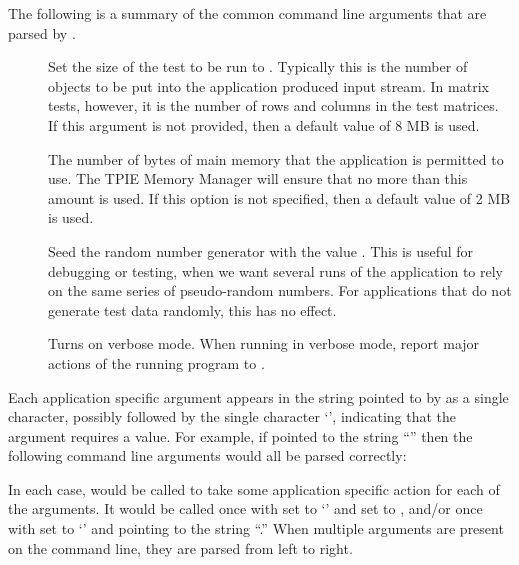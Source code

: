 The following is a summary of the common command line arguments that
are parsed by .
\begin{description}
    \item[] Set the size of the test to
    be run to .  Typically this is the
    number of objects to be put into the application
    produced input stream.  In matrix tests, however, it is
    the number of rows and columns in the test matrices.  If
    this argument is not provided, then a default value of
    8 MB is used.
    \item[] The number of bytes of main
    memory that the application is permitted to use.  The
    TPIE Memory Manager will ensure
    that no more than this amount is used.  If this option
    is not specified, then a default value of 2 MB is used.
    \item[] Seed the random number
    generator with the value .  This is
    useful for debugging or testing, when we want several
    runs of the application to rely on the same series of
    pseudo-random numbers.  For applications that do not
    generate test data randomly, this has no effect.
\item[]
Turns on verbose mode.  When running in verbose mode, report major
actions of the running program to .
\end{description}

Each application specific argument appears in the string pointed to by
 as a single character, possibly followed by the single
character `\myverb{:}', indicating that the argument requires a value.
For example, if  pointed to the string ``'' then the
following command line arguments would all be parsed correctly:
\begin{description}
\item[]
\item[]
\item[]
\item[]
\item[]
\end{description}
In each case,  would be called to take some
application specific action for each of the arguments.  It would be
called once with  set to `' and  set to
, and/or once with  set to `' and
 pointing to the string ``.''  When multiple arguments
are present on the command line, they are parsed from left to right.

